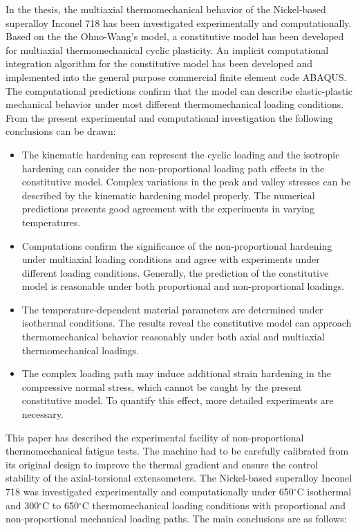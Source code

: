 In the thesis, the multiaxial thermomechanical behavior of the Nickel-based superalloy Inconel 718 has been investigated experimentally and computationally.
Based on the the Ohno-Wang's model, a constitutive model has been developed for multiaxial thermomechanical cyclic plasticity.
An implicit computational integration algorithm for the constitutive model has been developed and implemented into the general purpose commercial finite element code ABAQUS. The computational predictions confirm that the model can describe elastic-plastic mechanical behavior under most different thermomechanical loading conditions.
From the present experimental and computational investigation the following conclusions can be drawn:
\begin{itemize}

\item {The kinematic hardening can represent the cyclic loading and the isotropic hardening can consider the non-proportional loading path effects in the constitutive model.
Complex variations in the peak and valley stresses can be described by the kinematic hardening model properly. The numerical predictions presents good agreement with the experiments in varying temperatures.}

\item {Computations confirm the significance of the non-proportional hardening under multiaxial loading conditions and agree with experiments under different loading conditions. Generally, the prediction of the constitutive model is reasonable under both proportional and non-proportional loadings.}

\item {The temperature-dependent material parameters are determined under isothermal conditions. The results reveal the constitutive model can approach thermomechanical behavior reasonably under both axial and multiaxial thermomechanical loadings.}

\item{The complex loading path may induce additional strain hardening in the compressive normal stress, which cannot be caught by the present constitutive model. To quantify this effect, more detailed experiments are necessary.}

\end{itemize}

This paper has described the experimental facility of non-proportional thermomechanical fatigue tests. The machine had to be carefully calibrated from its original design to improve the thermal gradient and ensure the control stability of the axial-torsional extensometers. The Nickel-based superalloy Inconel 718 was investigated experimentally and computationally under 650$^\circ$C isothermal and 300$^\circ$C to 650$^\circ$C thermomechanical loading conditions with proportional and non-proportional mechanical loading paths. The main conclusions are as follows:

